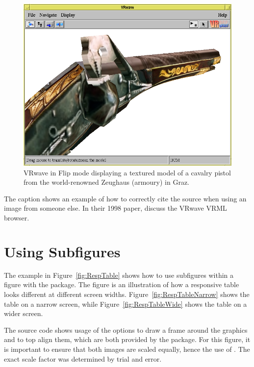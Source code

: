 \begin{figure}[tp]
\centering
\includegraphics[keepaspectratio,width=\linewidth,height=\halfh]
{images/pist.png}

\caption[VRwave in Flip Mode]
{%
VRwave in Flip mode displaying a textured model of a cavalry pistol
from the world-renowned Zeughaus (armoury) in Graz.
}
\label{fig:Pistol}
\end{figure}

The caption shows an example of how to correctly cite the source when
using an image from someone else. In their 1998 paper,
\textcite{Andrews-VRwave} discuss the VRwave VRML browser.




\section{Using Subfigures}

The example in Figure~\ref{fig:RespTable} shows how to use subfigures
within a figure with the  package. The figure is an
illustration of how a responsive table looks different at different
screen widths. Figure~\ref{fig:RespTableNarrow} shows the table on a
narrow screen, while Figure~\ref{fig:RespTableWide} shows the table on
a wider screen.

The source code shows usage of the  options
 to draw a frame around the graphics and 
to top align them, which are both provided by the 
package.  For this figure, it is important to ensure that both images
are scaled equally, hence the use of . The exact scale
factor was determined by trial and error.


